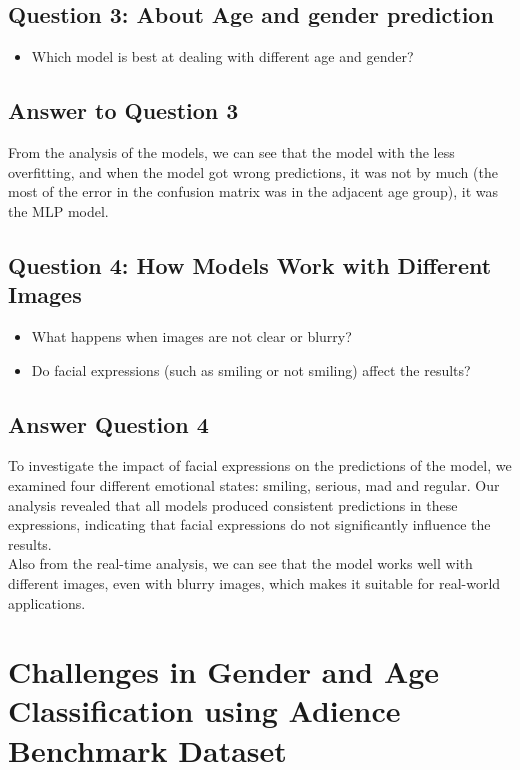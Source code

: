 \documentclass{article}
\begin{document}
\subsection*{Question 3: About Age and gender prediction}
\begin{itemize}[leftmargin=1.6cm]
    \item Which model is best at dealing with different age and gender?
    
\end{itemize}

\subsection*{Answer to Question 3}
From the analysis of the models, we can see that the model with the less overfitting, 
and when the model got wrong predictions, it was not by much (the most of the error in the confusion matrix was in the adjacent age group), it was the MLP model.

\subsection*{Question 4: How Models Work with Different Images}
\begin{itemize}[leftmargin=1.6cm]
    \item What happens when images are not clear or blurry?
    \item Do facial expressions (such as smiling or not smiling) affect the results?
\end{itemize}

\subsection*{Answer Question 4}
To investigate the impact of facial expressions on the predictions of the model,
we examined four different emotional states: smiling, serious, mad and regular. 
Our analysis revealed that all models produced consistent predictions in these expressions,
indicating that facial expressions do not significantly influence the results.\\
Also from the real-time analysis, we can see that the model works well with different images, even with blurry images, which makes it suitable for real-world applications.


\newpage
\section{Challenges in Gender and Age Classification using Adience Benchmark Dataset}
\end{document}

